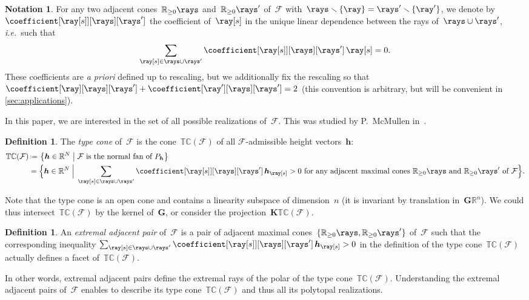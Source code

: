 \documentclass{amsart}
\theoremstyle{definition}
\newtheorem{definition}[theorem]{Definition}
\newtheorem{notation}[theorem]{Notation}
\newcommand{\R}{\mathbb{R}} %
\renewcommand{\b}[1]{{\boldsymbol{#1}}} %
\newcommand{\set}[2]{\left\{ #1 \;\middle|\; #2 \right\}} %
\newcommand{\Bigset}[2]{\Big\{ #1 \;\Big|\; #2 \Big\}} %
\newcommand{\ssm}{\smallsetminus} %
\newcommand{\eqdef}{\mbox{\,\raisebox{0.2ex}{\scriptsize\ensuremath{\mathrm:}}\ensuremath{=}\,}} %
\newcommand{\ie}{\textit{i.e.}~} %
\newcommand{\apriori}{\textit{a priori}} %
\newcommand{\darkblue}{\color{darkblue}} %
\newcommand{\defn}[1]{\textsl{\darkblue #1}} %
\newcommand{\Fan}{\mathcal{F}} %
\newcommand{\typeCone}{\mathbb{TC}} %
\begin{document}
\begin{notation}
For any two adjacent cones~$\R_{\ge0}\rays$ and~$\R_{\ge0}\rays'$ of~$\Fan$ with~$\rays \ssm \{\ray\} = \rays' \ssm \{\ray'\}$, we denote by~$\coefficient[{\ray[s]}][\rays][\rays']$ the coefficient of~$\ray[s]$ in the unique linear dependence between the rays of~$\rays \cup \rays'$, \ie such that
\[
\sum_{\ray[s] \in \rays \cup \rays'} \coefficient[{\ray[s]}][\rays][\rays'] \, \ray[s] = 0.
\]
These coefficients are \apriori{} defined up to rescaling, but we additionally fix the rescaling so that~${\coefficient[\ray][\rays][\rays'] + \coefficient[\ray'][\rays][\rays'] = 2}$ (this convention is arbitrary, but will be convenient in \cref{sec:applications}).
\end{notation}

In this paper, we are interested in the set of all possible realizations of~$\Fan$. This was studied by P.~McMullen in~\cite{McMullen-typeCone}.

\begin{definition}
The \defn{type cone} of~$\Fan$ is the cone~$\typeCone(\Fan)$ of all $\Fan$-admissible height vectors~$\b{h}$:
\begin{align*}
\typeCone(\Fan) & \eqdef \set{\b{h} \in \R^N}{\Fan \text{ is the normal fan of } P_\b{h}} \\
& = \Bigset{\b{h} \in \R^N}{\sum_{\ray[s] \in \rays \cup \rays'} \coefficient[{\ray[s]}][\rays][\rays'] \, \b{h}_{\ray[s]} > 0 \text{ for any adjacent maximal cones~$\R_{\ge0}\rays$ and~$\R_{\ge0}\rays'$ of~$\Fan$}}.
\end{align*}
\end{definition}

Note that the type cone is an open cone and contains a linearity subspace of dimension~$n$ (it is invariant by translation in~$\b{G} \R^n$). We could thus intersect~$\typeCone(\Fan)$ by the kernel of~$\b{G}$, or consider the projection~$\b{K}\typeCone(\Fan)$.

\begin{definition}
An \defn{extremal adjacent pair} of~$\Fan$ is a pair of adjacent maximal cones~$\{\R_{\ge0}\rays, \R_{\ge0}\rays'\}$ of~$\Fan$ such that the corresponding inequality $\sum_{\ray[s] \in \rays \cup \rays'} \coefficient[{\ray[s]}][\rays][\rays'] \, \b{h}_{\ray[s]} > 0$ in the definition of the type cone~$\typeCone(\Fan)$ actually defines a facet of~$\typeCone(\Fan)$.
\end{definition}

In other words, extremal adjacent pairs define the extremal rays of the polar of the type cone~$\typeCone(\Fan)$.
Understanding the extremal adjacent pairs of~$\Fan$ enables to describe its type cone~$\typeCone(\Fan)$ and thus all its polytopal realizations.
\end{document}
